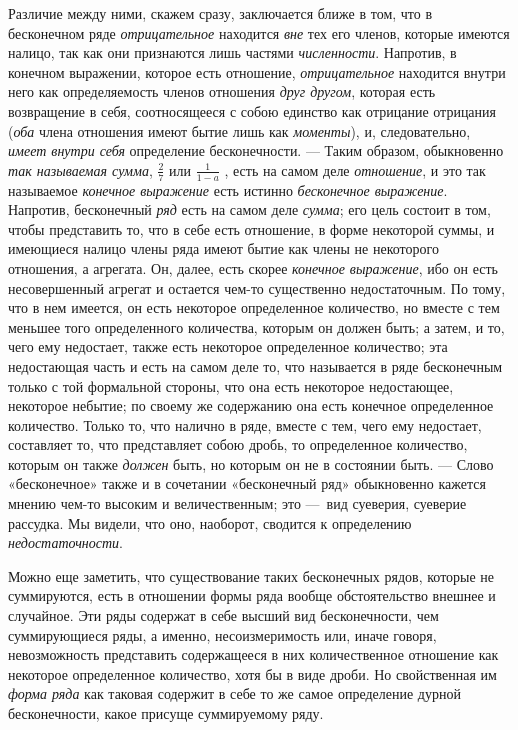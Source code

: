 Различие между ними, скажем сразу, заключается ближе в том, что в
бесконечном ряде {\em отрицательное} находится
{\em вне} тех его членов, которые имеются налицо, так
как они признаются лишь частями {\em численности}.
Напротив, в конечном выражении, которое есть отношение,
{\em отрицательное} находится внутри него как
определяемость членов отношения {\em друг другом},
которая есть возвращение в себя, соотносящееся с собою единство как
отрицание отрицания ({\em оба} члена отношения имеют
бытие лишь как {\em моменты}), и, следовательно,
{\em имеет внутри себя} определение бесконечности. —
Таким образом, обыкновенно {\em так называемая сумма}, 
$\frac 2 7$  или  $\frac 1{1-a}$ , есть на самом деле
{\em отношение}, и это так называемое
{\em конечное выражение} есть истинно
{\em бесконечное выражение}. Напротив, бесконечный
{\em ряд} есть на самом деле
{\em сумма}; его цель состоит в том, чтобы представить
то, что в себе есть отношение, в форме некоторой суммы, и имеющиеся налицо
члены ряда имеют бытие как члены не некоторого отношения, а агрегата. Он,
далее, есть скорее {\em конечное выражение}, ибо он
есть несовершенный агрегат и остается чем-то существенно недостаточным. По
тому, что в нем имеется, он есть некоторое определенное количество, но
вместе с тем меньшее того определенного количества, которым он должен быть;
а затем, и то, чего ему недостает, также есть некоторое определенное
количество; эта недостающая часть и есть на самом деле то, что называется в
ряде бесконечным только с той формальной стороны, что она есть некоторое
недостающее, некоторое небытие; по своему же содержанию она есть конечное
определенное количество. Только то, что налично в ряде, вместе с тем, чего
ему недостает, составляет то, что представляет собою дробь, то определенное
количество, которым он также {\em должен} быть, но
которым он не в состоянии быть. — Слово «бесконечное» также и в сочетании
«бесконечный ряд» обыкновенно кажется мнению чем-то высоким и
величественным; это —~вид суеверия, суеверие рассудка. Мы видели, что оно,
наоборот, сводится к определению {\em недостаточности}.

Можно еще заметить, что существование таких бесконечных рядов, которые не
суммируются, есть в отношении формы ряда вообще обстоятельство внешнее и
случайное. Эти ряды содержат в себе высший вид бесконечности, чем
суммирующиеся ряды, а именно, несоизмеримость или, иначе говоря,
невозможность представить содержащееся в них количественное отношение как
некоторое определенное количество, хотя бы в виде дроби. Но свойственная им
{\em форма ряда} как таковая содержит в себе то же
самое определение дурной бесконечности, какое присуще суммируемому ряду.

